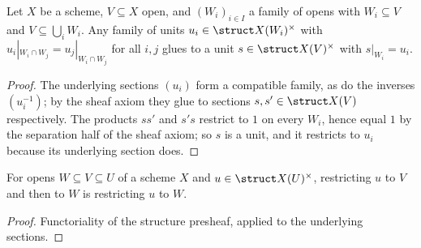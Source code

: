 \begin{lemma}
  \label{lem:units_gluing}
  \leanok
  Let \(X\) be a scheme, \(V \subseteq X\) open, and \((W_i)_{i \in I}\) a family of opens
  with \(W_i \subseteq V\) and \(V \subseteq \bigcup_i W_i\). Any family of units
  \(u_i \in \struct X(W_i)^{\times}\) with \(u_i|_{W_i \cap W_j} = u_j|_{W_i \cap W_j}\) for
  all \(i,j\) glues to a unit \(s \in \struct X(V)^{\times}\) with \(s|_{W_i} = u_i\).
\end{lemma}
\begin{proof}
  \leanok
  The underlying sections \((u_i)\) form a compatible family, as do the inverses
  \((u_i^{-1})\); by the sheaf axiom they glue to sections \(s, s' \in \struct X(V)\)
  respectively. The products \(s s'\) and \(s' s\) restrict to \(1\) on every \(W_i\), hence
  equal \(1\) by the separation half of the sheaf axiom; so \(s\) is a unit, and it restricts
  to \(u_i\) because its underlying section does.
\end{proof}

\begin{lemma}
  \label{lem:unitsRestrict_trans}
  \leanok
  For opens \(W \subseteq V \subseteq U\) of a scheme \(X\) and
  \(u \in \struct X(U)^{\times}\), restricting \(u\) to \(V\) and then to \(W\) is
  restricting \(u\) to \(W\).
\end{lemma}
\begin{proof}
  \leanok
  Functoriality of the structure presheaf, applied to the underlying sections.
\end{proof}

